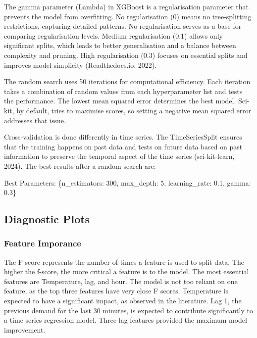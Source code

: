 \documentclass[mstat,12pt]{unswthesis}
\newenvironment{Shaded}{\begin{snugshade}}{\end{snugshade}}
\newcommand{\DecValTok}[1]{\textcolor[rgb]{0.00,0.00,0.81}{#1}}
\newcommand{\FloatTok}[1]{\textcolor[rgb]{0.00,0.00,0.81}{#1}}
\newcommand{\NormalTok}[1]{#1}
\newcommand{\StringTok}[1]{\textcolor[rgb]{0.31,0.60,0.02}{#1}}
\begin{document}
The gamma parameter (Lambda) in XGBoost is a regularisation parameter
that prevents the model from overfitting. No regularisation (0) means no
tree-splitting restrictions, capturing detailed patterns. No
regularisation serves as a base for comparing regularisation levels.
Medium regularisation (0.1) allows only significant splits, which leads
to better generalisation and a balance between complexity and pruning.
High regularisation (0.3) focuses on essential splits and improves model
simplicity (Readthedocs.io, 2022).

The random search uses 50 iterations for computational efficiency. Each
iteration takes a combination of random values from each hyperparameter
list and tests the performance. The lowest mean squared error determines
the best model. Sci-kit, by default, tries to maximise scores, so
setting a negative mean squared error addresses that issue.

Cross-validation is done differently in time series. The TimeSeriesSplit
ensures that the training happens on past data and tests on future data
based on past information to preserve the temporal aspect of the time
series (sci-kit-learn, 2024). The best results after a random search
are:

\begin{Shaded}
\begin{Highlighting}[]
\NormalTok{Best Parameters: \{}\StringTok{\textquotesingle{}n\_estimators\textquotesingle{}}\NormalTok{: }\DecValTok{300}\NormalTok{, }
                  \StringTok{\textquotesingle{}max\_depth\textquotesingle{}}\NormalTok{: }\DecValTok{5}\NormalTok{, }
                  \StringTok{\textquotesingle{}learning\_rate\textquotesingle{}}\NormalTok{: }\FloatTok{0.1}\NormalTok{, }
                  \StringTok{\textquotesingle{}gamma\textquotesingle{}}\NormalTok{: }\FloatTok{0.3}\NormalTok{\}}
\end{Highlighting}
\end{Shaded}

\subsection{Diagnostic Plots}\label{diagnostic-plots}

\subsubsection{Feature Imporance}\label{feature-imporance}

The F score represents the number of times a feature is used to split
data. The higher the f-score, the more critical a feature is to the
model. The most essential features are Temperature, lag, and hour. The
model is not too reliant on one feature, as the top three features have
very close F scores. Temperature is expected to have a significant
impact, as observed in the literature. Lag 1, the previous demand for
the last 30 minutes, is expected to contribute significantly to a time
series regression model. Three lag features provided the maximum model
improvement.
\end{document}
